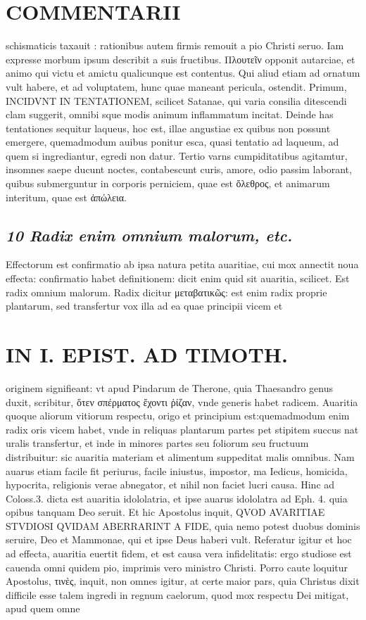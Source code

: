 \documentclass{article}
\begin{document}
\begin{pages}
\section*{COMMENTARII }
\marginpar{[ p.156 ]}\pstart schismaticis taxauit : rationibus autem firmis remouit a pio Christi seruo. Iam expresse morbum ipsum describit a suis fructibus. Πλουτεῖν opponit autarciae, et animo qui victu et amictu qualicunque est contentus. Qui aliud etiam ad ornatum vult habere, et ad voluptatem, hunc quae maneant pericula, ostendit.  \pend\pstart Primum, INCIDVNT IN TENTATIONEM, scilicet Satanae, qui varia consilia ditescendi clam suggerit, omnibi sque modis animum inflammatum incitat. Deinde has tentationes sequitur laqueus, hoc est, illae angustiae ex quibus non possunt emergere, quemadmodum auibus ponitur esca, quasi tentatio ad laqueum, ad quem si ingrediantur, egredi non datur. Tertio varns cumpiditatibus agitamtur, insomnes saepe ducunt noctes, contabescunt curis, amore, odio passim laborant, quibus submerguntur in corporis perniciem, quae est ὄλεθρος, et animarum interitum, quae est ἀπώλεια.  \pend
{}
{}
\subsection*{\textit{10 Radix enim omnium malorum, etc. }}\pstart Effectorum est confirmatio ab ipsa natura petita auaritiae, cui mox annectit noua effecta: confirmatio habet definitionem: dicit enim quid sit auaritia, scilicet. Est radix omnium malorum. Radix dicitur μεταβατικῶς: est enim radix proprie plantarum, sed transfertur vox illa ad ea quae principii vicem et  \pend
\section*{IN I. EPIST. AD TIMOTH. }
\marginpar{[ p.157 ]}\pstart originem signifieant: vt apud Pindarum de Therone, quia Thaesandro genus duxit, scribitur, ὅτεν σπέρματος ἔχοντι ῥίζαν, vnde generis habet radicem. Auaritia quoque aliorum vitiorum respectu, origo et principium est:quemadmodum enim radix oris vicem habet, vnde in reliquas plantarum partes pet stipitem succus nat uralis transfertur, et inde in minores partes seu foliorum seu fructuum distribuitur: sic auaritia materiam et alimentum suppeditat malis omnibus. Nam auarus etiam facile fit periurus, facile iniustus, impostor, ma Iedicus, homicida, hypocrita, religionis verae abnegator, et nihil non faciet lucri causa. Hinc ad Coloss.3. dicta est auaritia idololatria, et ipse auarus idololatra ad Eph. 4. quia opibus tanquam Deo seruit. Et hic Apostolus inquit, QVOD AVARITIAE STVDIOSI QVIDAM ABERRARINT A FIDE, quia nemo potest duobus dominis seruire, Deo et Mammonae, qui et ipse Deus haberi vult. Referatur igitur et hoc ad effecta, auaritia euertit fidem, et est causa vera infidelitatis: ergo studiose est cauenda omni quidem pio, imprimis vero ministro Christi. Porro caute loquitur Apostolus, τινὲς, inquit, non omnes igitur, at certe maior pars, quia Christus dixit difficile esse talem ingredi in regnum caelorum, quod mox respectu Dei mitigat, apud quem omne  \pend

\end{pages}
\end{document}
